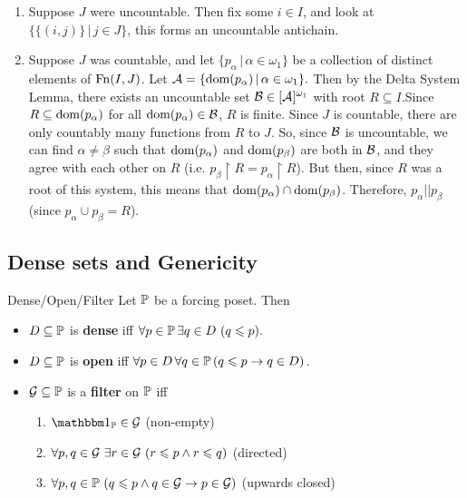 \documentclass{article}
\begin{document}
\begin{enumerate}
    \item[($\Rightarrow$)] Suppose $J$ were uncountable. Then fix some $i \in I$, and look at $\{ \{(i,j)\} \, | \, j \in J\}$, this forms an uncountable antichain.
    \item[($\Leftarrow$)] Suppose $J$ was countable, and let $\{p_{\alpha} \, | \, \alpha \in \omega_{1} \}$ be a collection of distinct elements of $\operatorname{Fn}(I,J)$. Let $\mathcal{A} = \{ \operatorname{dom}(p_{\alpha}) \, | \, \alpha \in \omega_{1}\}.$ Then by the Delta System Lemma, there exists an uncountable set $\mathcal{B} \in [\mathcal{A}]^{\omega_{1}}$ with root $R \subseteq I$.\gap Since $R \subseteq \operatorname{dom}(p_{\alpha})$ for all $\operatorname{dom}(p_{\alpha}) \in \mathcal{B}$, $R$ is finite. Since $J$ is countable, there are only countably many functions from $R$ to $J$. So, since $\mathcal{B}$ is uncountable, we can find $\alpha \neq \beta$ such that $\operatorname{dom}(p_{\alpha})$ and $\operatorname{dom}(p_{\beta})$ are both in $\mathcal{B}$, and they agree with each other on $R$ (i.e. $p_{\beta} \upharpoonright R = p_{\alpha} \upharpoonright R$). But then, since $R$ was a root of this system, this means that $\operatorname{dom}(p_{\alpha}) \cap \operatorname{dom}(p_{\beta})$. Therefore, $p_{\alpha} || p_{\beta}$ (since $p_{\alpha} \cup p_{\beta} = R$).
\end{enumerate}
\endproof
\subsection{Dense sets and Genericity}
\begin{fancydefine}{Dense/Open/Filter}
    Let $\mathbb{P}$ be a forcing poset. Then \begin{itemize}
        \item $D \subseteq \mathbb{P}$ is \textbf{dense} iff $\forall p \in \mathbb{P} \, \exists q \in D\,\,(q \leqslant p).$
        \item $D \subseteq \mathbb{P}$ is \textbf{open} iff $\forall p \in D \, \forall q \in \mathbb{P} \, (q \leqslant p \rightarrow q \in D)$.
        \item $\mathcal{G} \subseteq \mathbb{P}$ is a \textbf{filter} on $\mathbb{P}$ iff
              \begin{enumerate}
                  \item[(i)] $\bbone_{\bbP} \in \calG$ (non-empty)
                  \item[(ii)] $\forall p,q \in \mathcal{G}\,\, \exists r \in \mathcal{G} \,\, (r \leqslant p \wedge r \leqslant q)$ (directed)
                  \item[(iii)] $\forall p, q \in \mathbb{P} \,\, (q \leqslant p \wedge q \in \mathcal{G} \rightarrow p \in \mathcal{G})$ (upwards closed)
              \end{enumerate}
    \end{itemize}
\end{fancydefine}
\end{document}
